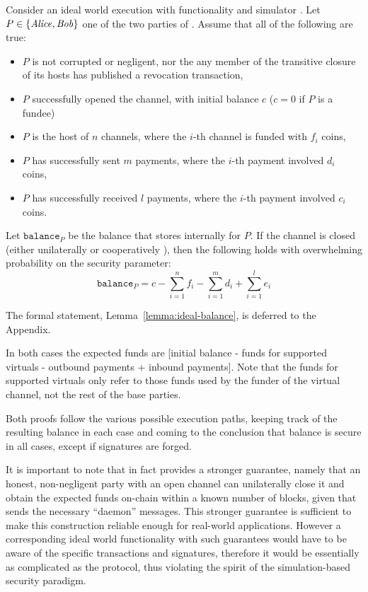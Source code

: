 \begin{lemma}
\label{lemma:ideal-balance-informal}
  Consider an ideal world execution with functionality \fchan and simulator
  \simulator. Let $P \in \{\mathit{Alice}, \mathit{Bob}\}$ one of the two parties of \fchan.
  Assume that all of the following are true:
  \begin{itemize}
    \item $P$ is not corrupted or negligent, nor the any member of the
    transitive closure of its hosts has published a revocation transaction,
    \item $P$ successfully opened the channel, with initial balance $c$ ($c = 0$
    if $P$ is a fundee)
    \item $P$ is the host of $n$ channels, where the $i$-th channel is funded
    with $f_i$ coins,
    \item $P$ has successfully sent $m$ payments, where the $i$-th payment
    involved $d_i$ coins,
    \item $P$ has successfully received $l$ payments, where the $i$-th payment
    involved $c_i$ coins.
  \end{itemize}
  Let $\texttt{balance}_P$ be the balance that \fchan stores internally for $P$.
  If the channel is closed (either unilaterally or cooperatively ), then the following holds with overwhelming
  probability on the security parameter:
  \begin{equation}
    \texttt{balance}_P = c - \sum\limits_{i=1}^n f_i -
    \sum\limits_{i=1}^m d_i + \sum\limits_{i=1}^l e_i
  \end{equation}
\end{lemma}
The formal statement, Lemma~\ref{lemma:ideal-balance}, is deferred to the
Appendix.

  In both cases the expected funds are [initial balance -
  funds for supported virtuals - outbound payments + inbound payments]. Note
  that the funds for supported virtuals only refer to those funds used by the
  funder of the virtual channel, not the rest of the base parties.

  Both proofs follow the various possible execution paths, keeping track of the
  resulting balance in each case and coming to the conclusion that balance is
  secure in all cases, except if signatures are forged.

  It is important to note that in fact \pchan provides a stronger guarantee,
  namely that an honest, non-negligent party with an open channel can
  unilaterally close it and obtain the expected funds on-chain within a known
  number of blocks, given that \environment sends the necessary ``daemon'' messages.
  This stronger guarantee is sufficient to make this construction reliable
  enough for real-world applications. However a corresponding ideal world
  functionality with such guarantees would have to be aware of the specific
  transactions and signatures, therefore it would be essentially as complicated
  as the protocol, thus violating the spirit of the simulation-based security
  paradigm.

